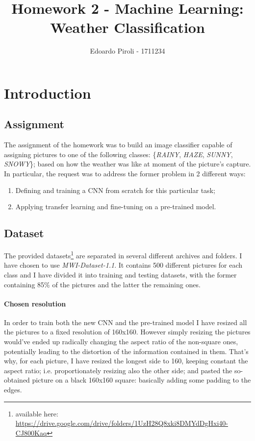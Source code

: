 \documentclass[a4paper]{article}
\title{Homework 2 - Machine Learning: Weather Classification}
\author{Edoardo Piroli - 1711234}
\begin{document}
\maketitle
\thispagestyle{empty}

\newpage
\tableofcontents
\thispagestyle{empty}
\newpage


\section{Introduction}
\subsection{Assignment}
The assignment of the homework was to build an image classifier capable of assigning pictures to one of the following classes: \{\textit{RAINY}, \textit{HAZE}, \textit{SUNNY}, \textit{SNOWY}\}; based on how the weather was like at moment of the picture's capture. In particular, the request was to address the former problem in 2 different ways: 
\begin{enumerate}
\item Defining and training a CNN from scratch for this particular task;
\item Applying transfer learning and fine-tuning on a pre-trained model.
\end{enumerate}
\subsection{Dataset}
The provided datasets\footnote{available here: \href{https://drive.google.com/drive/folders/1UzH28Q8xki8_DMYdDgHxi40-CJ800Kaq}{https://drive.google.com/drive/folders/1UzH28Q8xki8\textunderscore DMYdDgHxi40-CJ800Kaq}} are separated in several different archives and folders. I have chosen to use \textit{MWI-Dataset-1.1}. It contains 500 different pictures for each class and I have divided it into training and testing datasets, with the former containing 85\% of the pictures and the latter the remaining ones.

\paragraph{Chosen resolution}
In order to train both the new CNN and the pre-trained model I have resized all the pictures to a fixed resolution of 160x160. However simply resizing the pictures would've ended up radically changing the aspect ratio of the non-square ones, potentially leading to the distortion of the information contained in them. That's why, for each picture, I have resized the longest side to 160, keeping constant the aspect ratio; i.e. proportionately resizing also the other side; and pasted the so-obtained picture on a black 160x160 square: basically adding some padding to the edges. 
\end{document}
